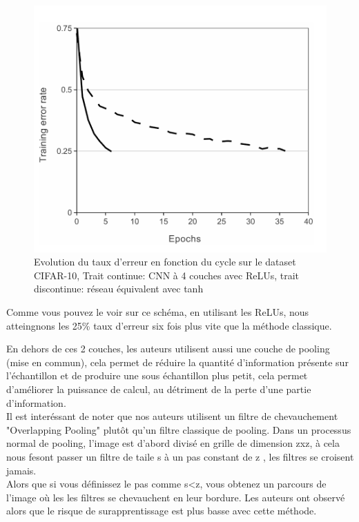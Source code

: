 \documentclass[12pt, letterpaper]{article}
\begin{document}
\begin{figure}[H]
    \includegraphics[width=\linewidth]{img/fig8.png}
    \caption{Evolution du taux d'erreur en fonction du cycle sur le dataset CIFAR-10, Trait continue: CNN à 4 couches avec ReLUs, trait discontinue: réseau équivalent avec tanh}
    \label{fig:L8}
\end{figure}
Comme vous pouvez le voir sur ce schéma, en utilisant les ReLUs, nous atteingnons les 25\% taux d'erreur six fois plus vite que la méthode classique.
\par En dehors de ces 2 couches, les auteurs utilisent aussi une couche de pooling (mise en commun), cela permet de réduire la quantité d'information présente sur l'échantillon et de produire 
une sous échantillon plus petit, cela permet d'améliorer la puissance de calcul, au détriment de la perte d'une partie d'information. \\
Il est interéssant de noter que nos auteurs utilisent un filtre de chevauchement "Overlapping Pooling" plutôt qu'un filtre classique de pooling. 
Dans un processus normal de pooling, l'image est d'abord divisé en grille de dimension zxz, à cela nous fesont passer un filtre de taile s à un pas constant de z , les filtres se croisent jamais. \\
Alors que si vous définissez le pas comme s<z, vous obtenez un parcours de l'image où les les filtres se chevauchent en leur bordure. Les auteurs ont observé alors que le 
risque de surapprentissage est plus basse avec cette méthode.
\end{document}

